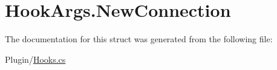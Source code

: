 \hypertarget{structOTA_1_1Plugin_1_1HookArgs_1_1NewConnection}{}\section{Hook\+Args.\+New\+Connection}
\label{structOTA_1_1Plugin_1_1HookArgs_1_1NewConnection}


The documentation for this struct was generated from the following file\+:\begin{DoxyCompactItemize}
\item 
Plugin/\hyperlink{Hooks_8cs}{Hooks.\+cs}\end{DoxyCompactItemize}
